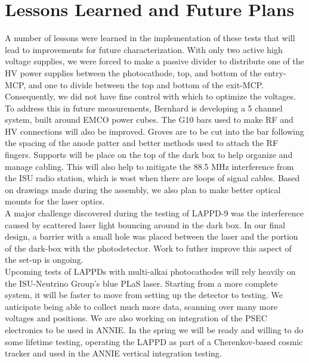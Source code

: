\documentclass[preprint,12pt]{elsarticle}
\begin{document}



\section{Lessons Learned and Future Plans}
\label{sec:Lessons}

\noindent A number of lessons were learned in the implementation of these tests that will lead to improvements for future characterization. With only two active high voltage supplies, we were forced to make a passive divider to distribute one of the HV power supplies between the photocathode, top, and bottom of the entry-MCP, and one to divide between the top and bottom of the exit-MCP. Consequently, we did not have fine control with which to optimize the voltages. To address this in future measurements, Bernhard is developing a 5 channel system, built around EMCO power cubes. The G10 bars used to make RF and HV connections will also be improved. Groves are to be cut into the bar following the spacing of the anode patter and better methods used to attach the RF fingers. Supports will be place on the top of the dark box to help organize and manage cabling. This will also help to mitigate the 88.5 MHz interference from the ISU radio station, which is wost when there are loops of signal cables. Based on drawings made during the assembly, we also plan to make better optical mounts for the laser optics.\\

\noindent A major challenge discovered during the testing of LAPPD-9  was the interference caused by scattered laser light bouncing around in the dark box. In our final design, a barrier with a small hole was placed between the laser and the portion of the dark-box with the photodetector. Work to futher improve this aspect of the set-up is ongoing.\\

\noindent Upcoming tests of LAPPDs with multi-alkai photocathodes will rely heavily on the ISU-Neutrino Group's blue PLaS laser. Starting from a more complete system, it will be faster to move from setting up the detector to testing. We anticipate being able to collect much more data, scanning over many more voltages and positions. We are also working on integration of the PSEC electronics to be used in ANNIE. In the spring we will be ready and willing to do some lifetime testing, operating the LAPPD as part of a Cherenkov-based cosmic tracker and used in the ANNIE vertical integration testing.\\
\end{document}
